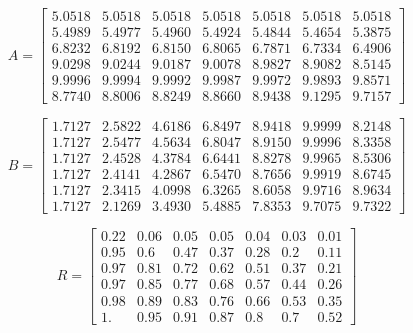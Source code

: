 \small
\begin{equation*}
    A = 
    \begin{bmatrix}
        5.0518 & 5.0518 & 5.0518 & 5.0518 & 5.0518 & 5.0518 & 5.0518 \\
        5.4989 & 5.4977 & 5.4960 & 5.4924 & 5.4844 & 5.4654 & 5.3875 \\
        6.8232 & 6.8192 & 6.8150 & 6.8065 & 6.7871 & 6.7334 & 6.4906 \\
        9.0298 & 9.0244 & 9.0187 & 9.0078 & 8.9827 & 8.9082 & 8.5145 \\
        9.9996 & 9.9994 & 9.9992 & 9.9987 & 9.9972 & 9.9893 & 9.8571 \\
        8.7740 & 8.8006 & 8.8249 & 8.8660 & 8.9438 & 9.1295 & 9.7157
    \end{bmatrix}
\end{equation*}

\begin{equation*}
    B = 
    \begin{bmatrix}
        1.7127 & 2.5822 & 4.6186 & 6.8497 & 8.9418 & 9.9999 & 8.2148 \\
        1.7127 & 2.5477 & 4.5634 & 6.8047 & 8.9150 & 9.9996 & 8.3358 \\
        1.7127 & 2.4528 & 4.3784 & 6.6441 & 8.8278 & 9.9965 & 8.5306 \\
        1.7127 & 2.4141 & 4.2867 & 6.5470 & 8.7656 & 9.9919 & 8.6745 \\
        1.7127 & 2.3415 & 4.0998 & 6.3265 & 8.6058 & 9.9716 & 8.9634 \\
        1.7127 & 2.1269 & 3.4930 & 5.4885 & 7.8353 & 9.7075 & 9.7322
    \end{bmatrix}
\end{equation*}

\begin{equation}
    R = 
    \begin{bmatrix}
        0.22 & 0.06 & 0.05 & 0.05 & 0.04 & 0.03 & 0.01 \\
        0.95 & 0.6  & 0.47 & 0.37 & 0.28 & 0.2  & 0.11 \\
        0.97 & 0.81 & 0.72 & 0.62 & 0.51 & 0.37 & 0.21 \\
        0.97 & 0.85 & 0.77 & 0.68 & 0.57 & 0.44 & 0.26 \\
        0.98 & 0.89 & 0.83 & 0.76 & 0.66 & 0.53 & 0.35 \\
        1.   & 0.95 & 0.91 & 0.87 & 0.8  & 0.7  & 0.52
    \end{bmatrix}
\end{equation}
\normalsize

